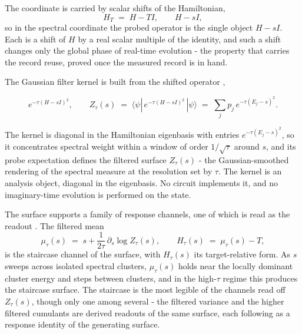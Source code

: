 The coordinate is carried by scalar shifts of the Hamiltonian,
\[
H_T \;=\; H - T I, \qquad H - s I ,
\]
so in the spectral coordinate the probed operator is the single object $H - sI$. Each is a shift of $H$ by a real scalar multiple of the identity, and such a shift changes only the global phase of real-time evolution - the property that carries the record reuse, proved once the measured record is in hand.

The Gaussian filter kernel is built from the shifted operator \cite{mccaul2025snacks},
\begin{widetext}
\begin{equation}\label{def:filter-kernel}
e^{-\tau (H - sI)^2}, \qquad Z_\tau(s) \;=\; \langle\psi|\,e^{-\tau (H - sI)^2}\,|\psi\rangle \;=\; \sum_j p_j\,e^{-\tau (E_j - s)^2}.
\end{equation}
\end{widetext}
The kernel is diagonal in the Hamiltonian eigenbasis with entries $e^{-\tau(E_j - s)^2}$, so it concentrates spectral weight within a window of order $1/\sqrt{\tau}$ around $s$, and its probe expectation defines the filtered surface $Z_\tau(s)$ - the Gaussian-smoothed rendering of the spectral measure at the resolution set by $\tau$. The kernel is an analysis object, diagonal in the eigenbasis. No circuit implements it, and no imaginary-time evolution is performed on the state.

The surface supports a family of response channels, one of which is read as the readout \cite{mccaul2025snacks}. The filtered mean
\begin{equation}\label{def:staircase}
\mu_\tau(s) \;=\; s + \frac{1}{2\tau}\,\partial_s \log Z_\tau(s), \qquad H_\tau(s) \;=\; \mu_\tau(s) - T,
\end{equation}
is the staircase channel of the surface, with $H_\tau(s)$ its target-relative form. As $s$ sweeps across isolated spectral clusters, $\mu_\tau(s)$ holds near the locally dominant cluster energy and steps between clusters, and in the high-$\tau$ regime this produces the staircase surface. The staircase is the most legible of the channels read off $Z_\tau(s)$, though only one among several - the filtered variance and the higher filtered cumulants are derived readouts of the same surface, each following as a response identity of the generating surface.

